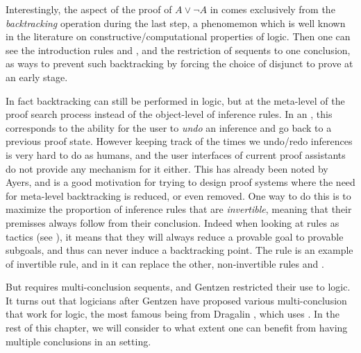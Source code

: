 Interestingly, the  aspect of the proof of $A \lor \neg A$ in
 comes exclusively from the \emph{backtracking} operation during
the last step, a phenomemon which is well known in the literature on
constructive/computational properties of  logic.
Then one can see the introduction rules {} and {},
and the restriction of  sequents to one conclusion, as ways to
prevent such backtracking by forcing the choice of disjunct to prove at an early
stage.

In fact backtracking can still be performed in  logic, but at the
meta-level of the proof search process instead of the object-level of inference
rules. In an , this corresponds to the ability for the
user to \emph{undo} an inference and go back to a previous proof state. However
keeping track of the times we undo/redo inferences is very hard to do as humans,
and the user interfaces of current proof assistants do not provide any mechanism
for it either. This has already been noted by Ayers, and is a good motivation for trying to design
proof systems where the need for meta-level backtracking is reduced, or even
removed. One way to do this is to maximize the proportion of inference rules
that are \emph{invertible}, meaning that their premisses always follow from
their conclusion. Indeed when looking at rules as tactics (see ),
it means that they will always reduce a provable goal to provable subgoals, and
thus can never induce a backtracking point. The {} rule is an example of
invertible rule, and in  it can replace the other, non-invertible rules
{} and {}.

But {} requires multi-conclusion sequents, and Gentzen restricted
their use to  logic. It turns out that logicians after Gentzen have
proposed various multi-conclusion  that work for 
logic, the most famous being  from Dragalin
, which uses {}. In the rest of
this chapter, we will consider to what extent one can benefit from having
multiple conclusions in an  setting.

